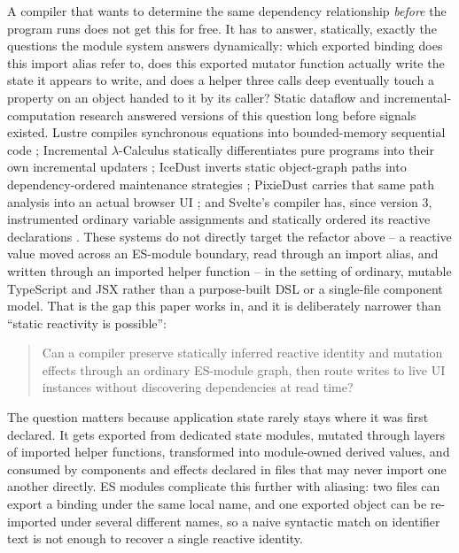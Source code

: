 \documentclass[conference]{IEEEtran}
\begin{document}
A compiler that wants to determine the same dependency relationship
\emph{before} the program runs does not get this for free. It has to answer,
statically, exactly the questions the module system answers dynamically:
which exported binding does this import alias refer to, does this exported
mutator function actually write the state it appears to write, and does a
helper three calls deep eventually touch a property on an object handed to it
by its caller? Static dataflow and incremental-computation research answered
versions of this question long before signals existed. Lustre compiles
synchronous equations into bounded-memory sequential code \cite{lustre};
Incremental $\lambda$-Calculus statically differentiates pure programs into
their own incremental updaters \cite{incremental-lambda}; IceDust inverts
static object-graph paths into dependency-ordered maintenance strategies
\cite{icedust}; PixieDust carries that same path analysis into an actual
browser UI \cite{pixiedust}; and Svelte's compiler has, since version 3,
instrumented ordinary variable assignments and statically ordered its
reactive declarations \cite{svelte3,svelte-legacy}. These systems do not
directly target the refactor above -- a reactive value moved
across an ES-module boundary, read through an import alias, and written
through an imported helper function -- in the setting of ordinary, mutable
TypeScript and JSX rather than a purpose-built DSL or a single-file component
model. That is the gap this paper works in, and it is deliberately narrower
than ``static reactivity is possible'':

\begin{quote}
Can a compiler preserve statically inferred reactive identity and mutation
effects through an ordinary ES-module graph, then route writes to live UI
instances without discovering dependencies at read time?
\end{quote}

The question matters because application state rarely stays where it was
first declared. It gets exported from dedicated state modules, mutated
through layers of imported helper functions, transformed into module-owned
derived values, and consumed by components and effects declared in files that
may never import one another directly. ES modules complicate this further
with aliasing: two files can export a binding under the same local name, and
one exported object can be re-imported under several different names, so a
naive syntactic match on identifier text is not enough to recover a single
reactive identity.
\end{document}
